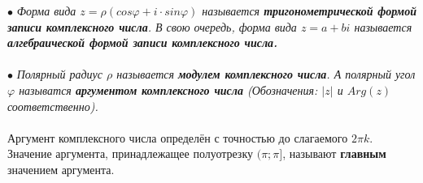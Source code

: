$\bullet$ \textit{Форма вида $z = \rho(cos\varphi + i\cdot sin\varphi)$ называется \textbf{тригонометрической формой записи комплексного числа}. В свою очередь, форма вида $z = a + bi$ называется \textbf{алгебраической формой записи комплексного числа.} }\\\\
$\bullet$ \textit{Полярный радиус $\rho$ называется \textbf{модулем комплексного числа}. А полярный угол $\varphi$ называтся \textbf{аргументом комплексного числа} (Обозначения: $|z|$ и $Arg(z)$ соответственно).}\\\\
Аргумент комплексного числа определён с точностью до слагаемого $2\pi k$. Значение аргумента, принадлежащее полуотрезку $(\pi;\pi]$, называют \textbf{главным} значением аргумента.\\\\

